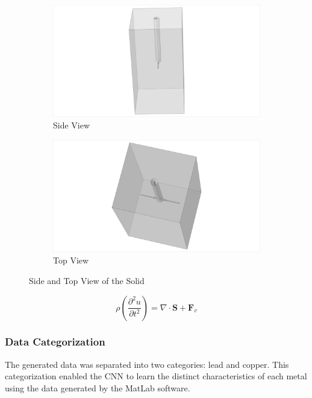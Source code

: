 \begin{figure}[t]
    \centering
    \begin{subfigure}[b]{0.4\textwidth}
        \centering
        \includegraphics[width=\textwidth]{./Model_Image.png}
        \caption{Side View}
        \label{fig:sub1}
    \end{subfigure}
    \hfill
    \begin{subfigure}[b]{0.4\textwidth}
        \centering
        \includegraphics[width=\textwidth]{./Model_Image_12.png}
        \caption{Top View}
        \label{fig:sub2}
    \end{subfigure}
    \caption{Side and Top View of the Solid}
    \label{fig:main}
\end{figure}


\begin{equation}
  \rho \left( \frac{\partial^2 u}{\partial t^2} \right) = \nabla \cdot \mathbf{S} + \mathbf{F}_v
\end{equation}


\subsubsection{Data Categorization}
The generated data was separated into two categories: lead and copper. This categorization enabled the CNN to learn the distinct characteristics of each metal using the data generated by the MatLab software.


% 				
% 



